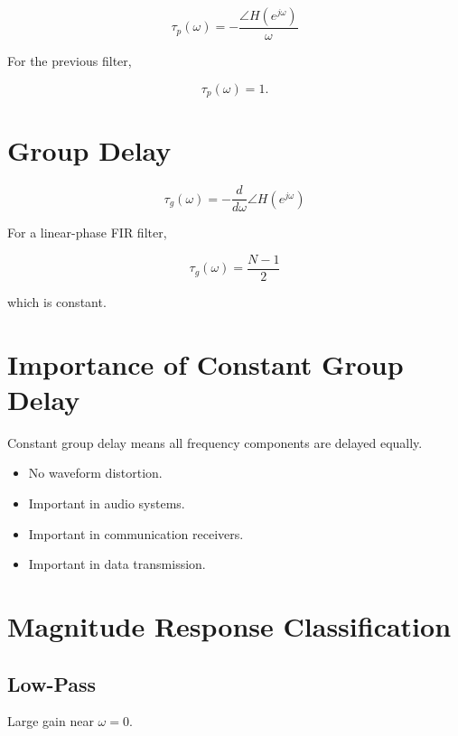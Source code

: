 \[
\boxed{
\tau_p(\omega)=
-\frac{\angle H(e^{j\omega})}{\omega}
}
\]

For the previous filter,

\[
\tau_p(\omega)=1.
\]


\section{Group Delay}

\[
\boxed{
\tau_g(\omega)=
-\frac{d}{d\omega}\angle H(e^{j\omega})
}
\]

For a linear-phase FIR filter,

\[
\boxed{
\tau_g(\omega)=\frac{N-1}{2}
}
\]

which is constant.


\section{Importance of Constant Group Delay}

Constant group delay means all frequency components are delayed equally.

\begin{itemize}
\item No waveform distortion.
\item Important in audio systems.
\item Important in communication receivers.
\item Important in data transmission.
\end{itemize}


\section{Magnitude Response Classification}


\subsection{Low-Pass}

Large gain near \(\omega=0\).

